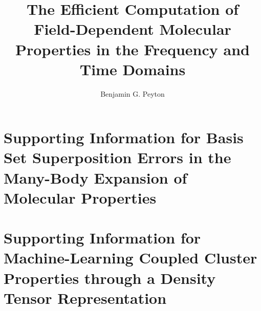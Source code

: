 \documentclass[doublespace,nopageskip]{VTthesis} %
\title{The Efficient Computation of Field-Dependent Molecular Properties in the Frequency and Time Domains}
\author{Benjamin G. Peyton}
\begin{document}
  \frontmatter
  \maketitle
  \tableofcontents

	\listoffigures
	\listoftables

	\mainmatter
    
    
    
    
    
    

    

      
	
%	   

	\appendix
	\begin{appendices}
		\chapter{Supporting Information for Basis Set Superposition Errors in the Many-Body Expansion of Molecular Properties} \label{si:mbe}
        
        \chapter{Supporting Information for Machine-Learning Coupled Cluster Properties through a Density Tensor Representation} \label{si:ml}
        
	\end{appendices}
\end{document}
